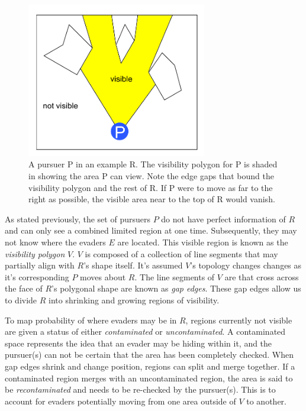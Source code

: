 \documentclass{article}
\begin{document}
\begin{figure}[htb]
\centering
\includegraphics[width=0.7\textwidth]{"visPoly"}
\caption{A pursuer P in an example R. The visibility polygon for P is shaded in showing the area P can view. Note the edge gaps that bound the visibility polygon and the rest of R. If P were to move as far to the right as possible, the visible area near to the top of R would vanish.}
\end{figure}

As stated previously, the set of pursuers \(P\) do not have perfect information of \(R\) and can only see a combined limited region at one time. Subsequently, they may not know where the evaders \(E\) are located. This visible region is known as the \emph{visibility polygon} \(V\). \(V\) is composed of a collection of line segments that may partially align with \(R\)'s shape itself. It's assumed \(V\)'s topology changes changes as it's corresponding \(P\) moves about \(R\). The line segments of \(V\) are that cross across the face of \(R\)'s polygonal shape are known as \emph{gap edges}. These gap edges allow us to divide \(R\) into shrinking and growing regions of visibility. \cite{limVis, robotics}

To map probability of where evaders may be in \(R\), regions currently not visible are given a status of either \emph{contaminated} or \emph{uncontaminated}. A contaminated space represents the idea that an evader may be hiding within it, and the pursuer(s) can not be certain that the area has been completely checked. When gap edges shrink and change position, regions can split and merge together. If a contaminated region merges with an uncontaminated region, the area is said to be \emph{recontaminated} and needs to be re-checked by the pursuer(s). This is to account for evaders potentially moving from one area outside of \(V\) to another.
\end{document}
